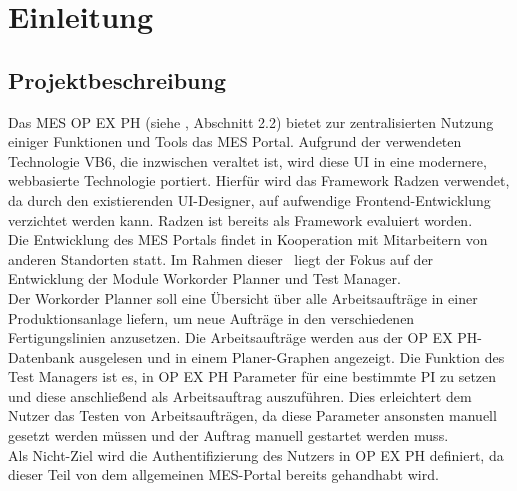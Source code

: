
\chapter{Einleitung}
\section{Projektbeschreibung}
Das \gls{MES} \gls{OP EX PH} (siehe , Abschnitt 2.2) bietet zur zentralisierten Nutzung einiger Funktionen und Tools das \gls{MES} Portal. Aufgrund der verwendeten Technologie \gls{VB}6, die inzwischen veraltet ist, wird diese \gls{UI} in eine modernere, webbasierte Technologie portiert. Hierfür wird das Framework Radzen verwendet, da durch den existierenden \gls{UI}-Designer, auf aufwendige Frontend-Entwicklung verzichtet werden kann. Radzen ist bereits als Framework evaluiert worden.\\
Die Entwicklung des \gls{MES} Portals findet in Kooperation mit Mitarbeitern von anderen Standorten statt. Im Rahmen dieser \Was\ liegt der Fokus auf der Entwicklung der Module Workorder Planner und Test Manager.\\
Der Workorder Planner soll eine Übersicht über alle Arbeitsaufträge in einer Produktionsanlage liefern, um neue Aufträge in den verschiedenen Fertigungslinien anzusetzen. Die Arbeitsaufträge werden aus der \gls{OP EX PH}-Datenbank ausgelesen und in einem Planer-Graphen angezeigt.
Die Funktion des Test Managers ist es, in \gls{OP EX PH} Parameter für eine bestimmte \gls{PI} zu setzen und diese anschließend als Arbeitsauftrag auszuführen. Dies erleichtert dem Nutzer das Testen von Arbeitsaufträgen, da diese Parameter ansonsten manuell gesetzt werden müssen und der Auftrag manuell gestartet werden muss.\\
Als Nicht-Ziel wird die Authentifizierung des Nutzers in \gls{OP EX PH} definiert, da dieser Teil von dem allgemeinen \gls{MES}-Portal bereits gehandhabt wird.

